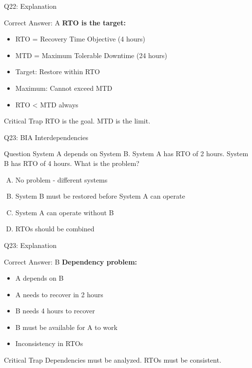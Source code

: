 \documentclass{beamer}
\begin{document}
			\begin{frame}{Q22: Explanation}
				\begin{block}{Correct Answer: A}
					\textbf{RTO is the target:}
					\begin{itemize}
						\item RTO = Recovery Time Objective (4 hours)
						\item MTD = Maximum Tolerable Downtime (24 hours)
						\item Target: Restore within RTO
						\item Maximum: Cannot exceed MTD
						\item RTO < MTD always
					\end{itemize}
				\end{block}
				\begin{alertblock}{Critical Trap}
					RTO is the goal. MTD is the limit.
				\end{alertblock}
			\end{frame}
			
			\begin{frame}{Q23: BIA Interdependencies}
				\begin{block}{Question}
					System A depends on System B. System A has RTO of 2 hours. System B has RTO of 4 hours. What is the problem?
				\end{block}
				\begin{enumerate}[(A)]
					\item No problem - different systems
					\item System B must be restored before System A can operate
					\item System A can operate without B
					\item RTOs should be combined
				\end{enumerate}
			\end{frame}
			
			\begin{frame}{Q23: Explanation}
				\begin{block}{Correct Answer: B}
					\textbf{Dependency problem:}
					\begin{itemize}
						\item A depends on B
						\item A needs to recover in 2 hours
						\item B needs 4 hours to recover
						\item B must be available for A to work
						\item Inconsistency in RTOs
					\end{itemize}
				\end{block}
				\begin{alertblock}{Critical Trap}
					Dependencies must be analyzed. RTOs must be consistent.
				\end{alertblock}
			\end{frame}
			
\end{document}
